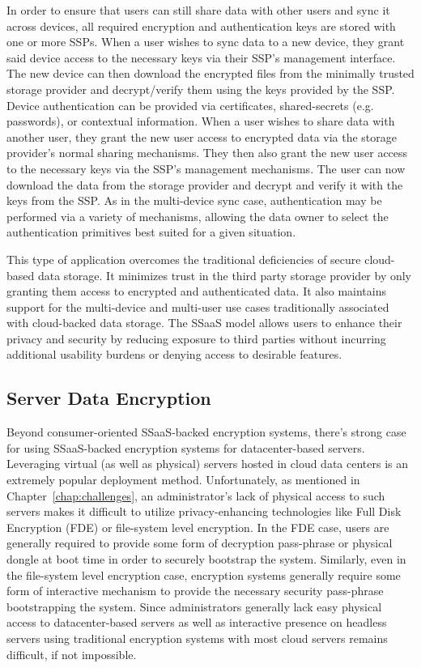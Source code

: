 In order to ensure that users can still share data with other users
and sync it across devices, all required encryption and authentication
keys are stored with one or more SSPs. When a user wishes to sync data
to a new device, they grant said device access to the necessary keys
via their SSP's management interface. The new device can then download
the encrypted files from the minimally trusted storage provider and
decrypt/verify them using the keys provided by the SSP. Device
authentication can be provided via certificates, shared-secrets
(e.g. passwords), or contextual information. When a user wishes to
share data with another user, they grant the new user access to
encrypted data via the storage provider's normal sharing
mechanisms. They then also grant the new user access to the necessary
keys via the SSP's management mechanisms. The user can now download
the data from the storage provider and decrypt and verify it with the
keys from the SSP. As in the multi-device sync case, authentication
may be performed via a variety of mechanisms, allowing the data owner
to select the authentication primitives best suited for a given
situation.

This type of application overcomes the traditional deficiencies of
secure cloud-based data storage. It minimizes trust in the third party
storage provider by only granting them access to encrypted and
authenticated data. It also maintains support for the multi-device and
multi-user use cases traditionally associated with cloud-backed data
storage. The SSaaS model allows users to enhance their privacy and
security by reducing exposure to third parties without incurring
additional usability burdens or denying access to desirable features.

\subsection{Server Data Encryption}

Beyond consumer-oriented SSaaS-backed encryption systems, there's
strong case for using SSaaS-backed encryption systems for
datacenter-based servers. Leveraging virtual (as well as physical)
servers hosted in cloud data centers is an extremely popular
deployment method. Unfortunately, as mentioned in
Chapter~\ref{chap:challenges}, an administrator's lack of physical
access to such servers makes it difficult to utilize privacy-enhancing
technologies like Full Disk Encryption (FDE) or file-system level
encryption. In the FDE case, users are generally required to provide
some form of decryption pass-phrase or physical dongle at boot time in
order to securely bootstrap the system. Similarly, even in the
file-system level encryption case, encryption systems generally
require some form of interactive mechanism to provide the necessary
security pass-phrase bootstrapping the system. Since administrators
generally lack easy physical access to datacenter-based servers as
well as interactive presence on headless servers using traditional
encryption systems with most cloud servers remains difficult, if not
impossible.

